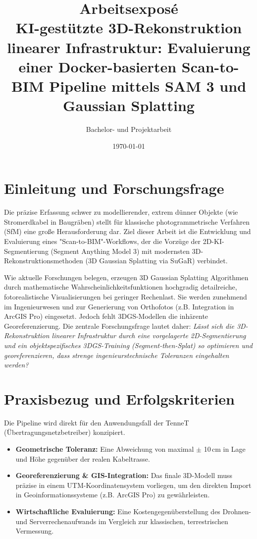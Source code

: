 \documentclass[12pt,a4paper]{article}
\title{\textbf{Arbeitsexposé}\\KI-gestützte 3D-Rekonstruktion linearer Infrastruktur: Evaluierung einer Docker-basierten Scan-to-BIM Pipeline mittels SAM 3 und Gaussian Splatting}
\author{Bachelor- und Projektarbeit}
\date{\today}
\begin{document}
\maketitle

\section{Einleitung und Forschungsfrage}
Die präzise Erfassung schwer zu modellierender, extrem dünner Objekte (wie Stromerdkabel in Baugräben) stellt für klassische photogrammetrische Verfahren (SfM) eine große Herausforderung dar. Ziel dieser Arbeit ist die Entwicklung und Evaluierung eines "Scan-to-BIM"-Workflows, der die Vorzüge der 2D-KI-Segmentierung (Segment Anything Model 3) mit modernsten 3D-Rekonstruktionsmethoden (3D Gaussian Splatting via SuGaR) verbindet.

Wie aktuelle Forschungen belegen, erzeugen 3D Gaussian Splatting Algorithmen durch mathematische Wahrscheinlichkeitsfunktionen hochgradig detailreiche, fotorealistische Visualisierungen bei geringer Rechenlast. Sie werden zunehmend im Ingenieurwesen und zur Generierung von Orthofotos (z.B. Integration in ArcGIS Pro) eingesetzt. Jedoch fehlt 3DGS-Modellen die inhärente Georeferenzierung.
Die zentrale Forschungsfrage lautet daher: \textit{Lässt sich die 3D-Rekonstruktion linearer Infrastruktur durch eine vorgelagerte 2D-Segmentierung und ein objektspezifisches 3DGS-Training (Segment-then-Splat) so optimieren und georeferenzieren, dass strenge ingenieurstechnische Toleranzen eingehalten werden?}

\section{Praxisbezug und Erfolgskriterien}
Die Pipeline wird direkt für den Anwendungsfall der TenneT (Übertragungsnetzbetreiber) konzipiert.
\begin{itemize}
    \item \textbf{Geometrische Toleranz:} Eine Abweichung von maximal $\pm$ 10\,cm in Lage und Höhe gegenüber der realen Kabeltrasse.
    \item \textbf{Georeferenzierung \& GIS-Integration:} Das finale 3D-Modell muss präzise in einem UTM-Koordinatensystem vorliegen, um den direkten Import in Geoinformationssysteme (z.B. ArcGIS Pro) zu gewährleisten.
    \item \textbf{Wirtschaftliche Evaluierung:} Eine Kostengegenüberstellung des Drohnen- und Serverrechenaufwands im Vergleich zur klassischen, terrestrischen Vermessung.
\end{itemize}
\end{document}
